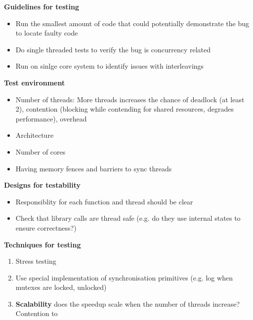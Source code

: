 \documentclass[10pt, landscape]{article}
\begin{document}
\begin{multicols}{4}
\textbf{Guidelines for testing} \\ 
\begin{itemize}
    \item Run the smallest amount of code that could potentially demonstrate the bug to locate faulty code 
    \item Do single threaded tests to verify the bug is concurrency related 
    \item Run on sinlge core system to identify issues with interleavings
\end{itemize}

\textbf{Test environment} \\
\begin{itemize}
    \item Number of threads: More threads increases the chance of deadlock (at least 2), contention (blocking while contending for shared resources, degrades performance), overhead
    \item Architecture 
    \item Number of cores 
    \item Having memory fences and barriers to sync threads
\end{itemize}


\textbf{Designs for testability}\\
\begin{itemize}
    \item Responsiblity for each function and thread should be clear 
    \item Check that library calls are thread safe (e.g. do they use internal states to ensure correctness?)
\end{itemize}

\textbf{Techniques for testing} \\
\begin{enumerate}
    \item Stress testing
    \item Use special implementation of synchronisation primitives (e.g. log when mutexes are locked, unlocked)
    \item \textbf{Scalability} does the speedup scale when the number of threads increase? Contention to 
\end{enumerate}


\end{multicols}
\end{document}
